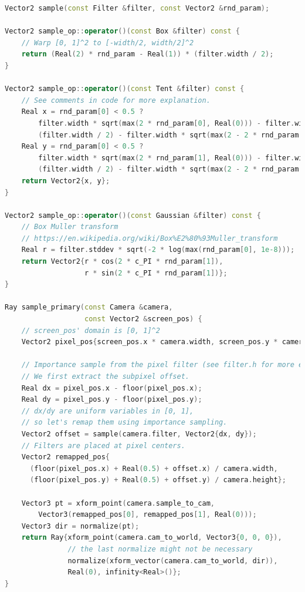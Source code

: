 \documentclass{article}
\begin{document}
\begin{lstlisting}[language=c++]
Vector2 sample(const Filter &filter, const Vector2 &rnd_param);

Vector2 sample_op::operator()(const Box &filter) const {
    // Warp [0, 1]^2 to [-width/2, width/2]^2
    return (Real(2) * rnd_param - Real(1)) * (filter.width / 2);
}

Vector2 sample_op::operator()(const Tent &filter) const {
    // See comments in code for more explanation.
    Real x = rnd_param[0] < 0.5 ? 
        filter.width * sqrt(max(2 * rnd_param[0], Real(0))) - filter.width / 2 :
        (filter.width / 2) - filter.width * sqrt(max(2 - 2 * rnd_param[0], Real(0)));
    Real y = rnd_param[0] < 0.5 ? 
        filter.width * sqrt(max(2 * rnd_param[1], Real(0))) - filter.width / 2 :
        (filter.width / 2) - filter.width * sqrt(max(2 - 2 * rnd_param[1], Real(0)));
    return Vector2{x, y};
}

Vector2 sample_op::operator()(const Gaussian &filter) const {
    // Box Muller transform
    // https://en.wikipedia.org/wiki/Box%E2%80%93Muller_transform
    Real r = filter.stddev * sqrt(-2 * log(max(rnd_param[0], 1e-8)));
    return Vector2{r * cos(2 * c_PI * rnd_param[1]),
                   r * sin(2 * c_PI * rnd_param[1])};
}

Ray sample_primary(const Camera &camera,
                   const Vector2 &screen_pos) {
    // screen_pos' domain is [0, 1]^2
    Vector2 pixel_pos{screen_pos.x * camera.width, screen_pos.y * camera.height};

    // Importance sample from the pixel filter (see filter.h for more explanation).
    // We first extract the subpixel offset.
    Real dx = pixel_pos.x - floor(pixel_pos.x);
    Real dy = pixel_pos.y - floor(pixel_pos.y);
    // dx/dy are uniform variables in [0, 1],
    // so let's remap them using importance sampling.
    Vector2 offset = sample(camera.filter, Vector2{dx, dy});
    // Filters are placed at pixel centers.
    Vector2 remapped_pos{
      (floor(pixel_pos.x) + Real(0.5) + offset.x) / camera.width,
      (floor(pixel_pos.y) + Real(0.5) + offset.y) / camera.height};

    Vector3 pt = xform_point(camera.sample_to_cam,
        Vector3(remapped_pos[0], remapped_pos[1], Real(0)));
    Vector3 dir = normalize(pt);
    return Ray{xform_point(camera.cam_to_world, Vector3{0, 0, 0}),
               // the last normalize might not be necessary
               normalize(xform_vector(camera.cam_to_world, dir)),
               Real(0), infinity<Real>()};
}
\end{lstlisting}
\end{document}
